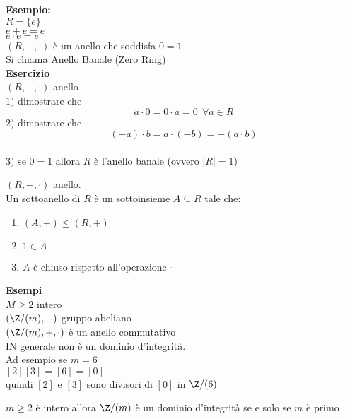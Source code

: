 \documentclass[12px]{article}
\begin{document}
	\textbf{Esempio:}\\
	$R = \{e\}$\\
	 $e + e = e$\\
	  $e\cdot e = e$\\
	   $(R,+,\cdot)$ è un anello che soddisfa $0 =1$\\
	   Si chiama Anello Banale (Zero Ring) \\
	   \textbf{Esercizio}\\
	   $(R,+,\cdot)$ anello\\
	   $1)$ dimostrare che  \[a \cdot 0 =0\cdot a  = 0 \ \ \forall a\in R\]
   $2)$ dimostrare che  \[(-a)\cdot b = a\cdot (-b) = - (a \cdot b)\]\\
   $3)$ se $0 = 1$ allora  $R$ è l'anello banale (ovvero $|R| = 1$)\\
    \begin{defi}
   	$(R, + ,\cdot)$ anello.\\
	Un sottoanello di $R$ è un sottoinsieme $A\subseteq R$ tale che:\\
	\begin{enumerate}
		\item $(A,+) \leq (R,+)$
		\item $1\in A$
		\item $A$ è chiuso rispetto all'operazione  $\cdot$
	\end{enumerate}
   \end{defi}
\textbf{Esempi}\\
$M\geq 2$ intero\\
 $(\Z/(m), + )$ gruppo abeliano\\
$(\Z/(m), + , \cdot)$ è un anello commutativo\\
IN generale non è un dominio d'integrità.\\
Ad esempio se  $m=6 $\\
$[2][3]=[6]=[0]$\\
quindi  $[2]$ e $[3]$ sono divisori di $[0]$ in $\Z/(6)$
\begin{prop}
	$m\geq 2 $ è intero allora $\Z/(m)$ è un dominio d'integrità se e solo se $m$ è primo
\end{prop}
\end{document}
